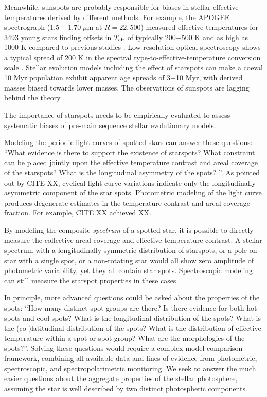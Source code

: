 \documentclass[onecolumn]{emulateapj}%
\begin{document}
Meanwhile, sunspots are probably responsible for biases in stellar effective temperatures derived by different methods.  For example, the APOGEE spectrograph ($1.5-1.70 \;\mu$m at $R=22,500$) measured effective temperatures for 3493 young stars finding offsets in $T_\textrm{eff}$ of typically 200$-$500 K and as high as 1000 K compared to previous studies \citep{2014ApJ...794..125C}.  Low resolution optical spectroscopy shows a typical spread of 200 K in the spectral type-to-effective-temperature conversion scale \citep{2014ApJ...786...97H}.  Stellar evolution models including the effect of starspots can make a coeval 10 Myr population exhibit apparent age spreads of 3$-$10 Myr, with derived masses biased towards lower masses.  The observations of sunspots are lagging behind the theory \citep{2015ApJ...807..174S}.

The importance of starspots needs to be empirically evaluated to assess systematic biases of pre-main sequence stellar evolutionary models.

Modeling the periodic light curves of spotted stars can answer these questions: ``What evidence is there to support the existence of starspots?  What constraint can be placed jointly upon the effective temperature contrast and areal coverage of the starspots?  What is the longitudinal asymmetry of the spots?  ''.  As pointed out by CITE XX, cyclical light curve variations indicate only the longitudinally asymmetric component of the star spots.  Photometric modeling of the light curve produces degenerate estimates in the temperature contrast and areal coverage fraction.  For example, CITE XX achieved XX.  

By modeling the composite \emph{spectrum} of a spotted star, it is possible to directly measure the collective areal coverage and effective temperature contrast.  A stellar spectrum with a longitudinally symmetric distribution of starspots, or a pole-on star with a single spot, or a non-rotating star would all show zero amplitude of photometric variability, yet they all contain star spots.  Spectroscopic modeling can still measure the starspot properties in these cases.  

In principle, more advanced questions could be asked about the properties of the spots: ``How many distinct spot groups are there?  Is there evidence for both hot spots and cool spots?  What is the longitudinal distribution of the spots?  What is the (co-)latitudinal distribution of the spots?  What is the distribution of effective temperature within a spot or spot group?  What are the morphologies of the spots?''.  Solving these questions would require a complex model comparison framework, combining all available data and lines of evidence from photometric, spectroscopic, and spectropolarimetric monitoring.  We seek to answer the much easier questions about the aggregate properties of the stellar photosphere, assuming the star is well described by two distinct photospheric components.  
\end{document}
